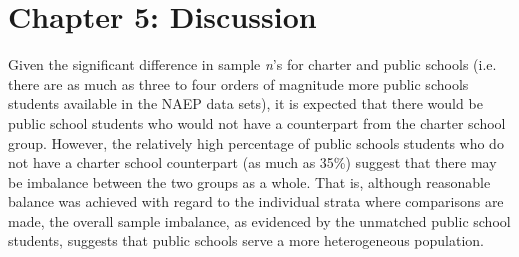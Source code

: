 \documentclass[letterpaper,12p,twoside]{article} %
\begin{document}



\cleardoublepage
\section{Chapter 5: Discussion}


Given the significant difference in sample \textit{n}'s for charter and public schools (i.e. there are as much as three to four orders of magnitude more public schools students available in the NAEP data sets), it is expected that there would be public school students who would not have a counterpart from the charter school group. However, the relatively high percentage of public schools students who do not have a charter school counterpart (as much as 35\%) suggest that there may be imbalance between the two groups as a whole. That is, although reasonable balance was achieved with regard to the individual strata where comparisons are made, the overall sample imbalance, as evidenced by the unmatched public school students, suggests that public schools serve a more heterogeneous population.


\cleardoublepage



\newpage

\cleardoublepage
{}
\appendix

\renewcommand{\thefootnote}{\fnsymbol{footnote}}%
\end{document}
